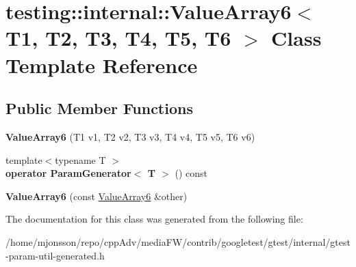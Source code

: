 \hypertarget{classtesting_1_1internal_1_1ValueArray6}{}\section{testing\+:\+:internal\+:\+:Value\+Array6$<$ T1, T2, T3, T4, T5, T6 $>$ Class Template Reference}
\label{classtesting_1_1internal_1_1ValueArray6}
\subsection*{Public Member Functions}
\begin{DoxyCompactItemize}
\item 
\mbox{\label{classtesting_1_1internal_1_1ValueArray6_ad1c323929591d89807220281ceb6d4d5}} 
{\bfseries Value\+Array6} (T1 v1, T2 v2, T3 v3, T4 v4, T5 v5, T6 v6)
\item 
\mbox{\label{classtesting_1_1internal_1_1ValueArray6_ab6cb557146bca7cf5fcfa40f10dee9da}} 
{\footnotesize template$<$typename T $>$ }\\{\bfseries operator Param\+Generator$<$ T $>$} () const
\item 
\mbox{\label{classtesting_1_1internal_1_1ValueArray6_a270702109b4185c6749310902fed7456}} 
{\bfseries Value\+Array6} (const \hyperlink{classtesting_1_1internal_1_1ValueArray6}{Value\+Array6} \&other)
\end{DoxyCompactItemize}


The documentation for this class was generated from the following file\+:\begin{DoxyCompactItemize}
\item 
/home/mjonsson/repo/cpp\+Adv/media\+F\+W/contrib/googletest/gtest/internal/gtest-\/param-\/util-\/generated.\+h\end{DoxyCompactItemize}
